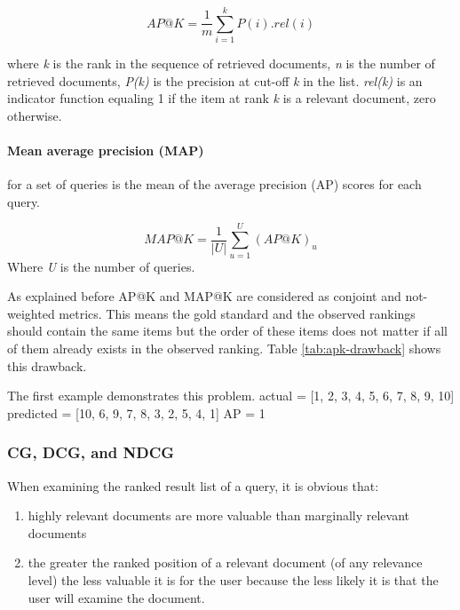 \begin{equation}
	AP@K = \frac{1}{m}\sum_{i=1}^{k}P(i).rel(i)
	\label{eq:ap@k}
\end{equation}

where \emph{k} is the rank in the sequence of retrieved documents, \emph{n} is the number of retrieved documents, \emph{P(k)} is the precision at cut-off \emph{k} in the list. \emph{rel(k)}
is an indicator function equaling 1 if the item at rank \emph{k} is a relevant document, zero otherwise.

\paragraph*{Mean average precision (MAP)} for a set of queries is the mean of the average precision (AP) scores for each query.

\begin{equation}
	MAP@K = \frac{1}{|U|}\sum_{u=1}^{U}(AP@K)_{u}
	\label{eq:map@k}
\end{equation}
Where \emph{U} is the number of queries.


As explained before AP@K and MAP@K are considered as conjoint and not-weighted metrics. This means the gold standard and the observed rankings should contain the same items but the order of these items does not matter if all of them already exists in the observed ranking. Table \ref{tab:apk-drawback} shows this drawback.

The first example demonstrates this problem.
actual = [1, 2, 3, 4, 5, 6, 7, 8, 9, 10]
predicted = [10, 6, 9, 7, 8, 3, 2, 5, 4, 1]
AP = 1


\subsubsection{CG, DCG, and NDCG}
\label{CG, DCG, and NDCG}
When examining the ranked result list of a query, it is obvious that:
\begin{enumerate}
	\item highly relevant documents are more valuable than marginally relevant documents
	\item the greater the ranked position of a relevant document (of any relevance level) the less valuable it is for the user because the less likely it is that the user will examine the document.
\end{enumerate}

